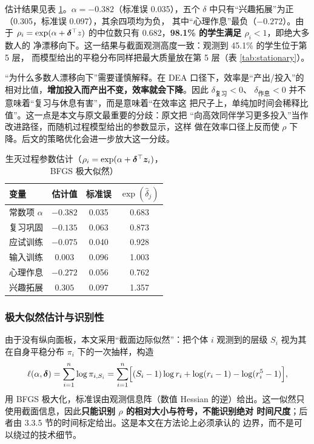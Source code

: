 估计结果见表 \ref{tab:ctmcpar}。$\alpha=-0.382$（标准误 0.035），五个
$\delta$ 中只有“兴趣拓展”为正（0.305，标准误 0.097），其余四项均为负，
其中“心理作息”最负（$-0.272$）。由于 $\rho_i=\exp(\alpha+\bm{\delta}^{\top}z)$
的中位数只有 0.682，\textbf{98.1\% 的学生满足 $\rho_i<1$}，即绝大多数人的
净漂移向下。这一结果与截面观测高度一致：观测到 45.1\% 的学生位于第 5 层，
而模型给出的平稳分布同样把最大质量放在第 5 层（表 \ref{tab:stationary}）。

“为什么多数人漂移向下”需要谨慎解释。在 DEA 口径下，效率是“产出/投入”的
相对比值，\textbf{增加投入而产出不变，效率就会下降}。因此 $\delta_{\text{复习}}<0$、
$\delta_{\text{作息}}<0$ 并不意味着“复习与休息有害”，而是意味着“在效率这
把尺子上，单纯加时间会稀释比值”。这一点是本文与原文最重要的分歧：原文把
“向高效同伴学习更多投入”当作改进路径，而随机过程模型给出的参数显示，这样
做在效率口径上反而使 $\rho$ 下降。后文的策略优化会进一步放大这一分歧。

\begin{table}[htbp]
\centering
\tabfont
\caption{生灭过程参数估计（$\rho_i=\exp(\alpha+\bm{\delta}^{\top}\bm{z}_i)$，BFGS 极大似然）}
\label{tab:ctmcpar}
\begin{tabular}{@{}lccc@{}}
\toprule
变量 & 估计值 & 标准误 & $\exp(\hat\delta_j)$ \\
\midrule
常数项 $\alpha$ & $-0.382$ & 0.035 & 0.683 \\
复习巩固 & $-0.135$ & 0.063 & 0.873 \\
应试训练 & $-0.075$ & 0.040 & 0.928 \\
输入训练 & $0.003$ & 0.096 & 1.003 \\
心理作息 & $-0.272$ & 0.056 & 0.762 \\
兴趣拓展 & $0.305$ & 0.097 & 1.357 \\
\bottomrule
\end{tabular}
\end{table}

\subsubsection{极大似然估计与识别性}

由于没有纵向面板，本文采用“截面边际似然”：把个体 $i$ 观测到的层级 $S_i$
视为其在自身平稳分布 $\pi_i$ 下的一次抽样，构造
\begin{equation}
\ell(\alpha,\bm{\delta})=\sum_{i=1}^{n}\log\pi_{i,S_i}
=\sum_{i=1}^{n}\Bigl[(S_i-1)\log r_i+\log(r_i-1)-\log(r_i^5-1)\Bigr],
\label{eq:lik}
\end{equation}
用 BFGS 极大化，标准误由观测信息阵（数值 Hessian 的逆）给出。这一似然只
使用截面信息，因此\textbf{只能识别 $\rho$ 的相对大小与符号，不能识别绝对
时间尺度}；后者由 3.3.5 节的时间标定给出。这是本文在方法论上必须承认的
边界，而不是可以绕过的技术细节。

